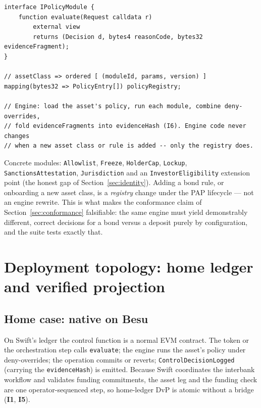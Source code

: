 \documentclass[11pt,a4paper]{article}
\newcommand{\Iref}[1]{\textbf{I#1}}
\begin{document}
\begin{lstlisting}[caption={The engine is fixed; policy is data. Each module is a
pure decision over an abstract request; the registry binds modules and parameters
to an asset class and is governed through PAP.},captionpos=b]
interface IPolicyModule {
    function evaluate(Request calldata r)
        external view
        returns (Decision d, bytes4 reasonCode, bytes32 evidenceFragment);
}

// assetClass => ordered [ (moduleId, params, version) ]
mapping(bytes32 => PolicyEntry[]) policyRegistry;

// Engine: load the asset's policy, run each module, combine deny-overrides,
// fold evidenceFragments into evidenceHash (I6). Engine code never changes
// when a new asset class or rule is added -- only the registry does.
\end{lstlisting}

Concrete modules: \texttt{Allowlist}, \texttt{Freeze}, \texttt{HolderCap},
\texttt{Lockup}, \texttt{SanctionsAttestation}, \texttt{Jurisdiction} and an
\texttt{InvestorEligibility} extension point (the honest gap of
Section~\ref{sec:identity}). Adding a bond rule, or onboarding a new asset class,
is a \emph{registry} change under the PAP lifecycle --- not an engine rewrite.
This is what makes the conformance claim of Section~\ref{sec:conformance}
falsifiable: the same engine must yield demonstrably different, correct decisions
for a bond versus a deposit purely by configuration, and the suite tests exactly
that.

\section{Deployment topology: home ledger and verified projection}
\label{sec:deploy}

\subsection{Home case: native on Besu}
On Swift's ledger the control function is a normal EVM contract. The token or the
orchestration step calls \texttt{evaluate}; the engine runs the asset's policy
under deny-overrides; the operation commits or reverts;
\texttt{ControlDecisionLogged} (carrying the \texttt{evidenceHash}) is emitted.
Because Swift coordinates the interbank workflow and validates funding
commitments, the asset leg and the funding check are one operator-sequenced step,
so home-ledger DvP is atomic without a bridge (\Iref{1}, \Iref{5}).
\end{document}
